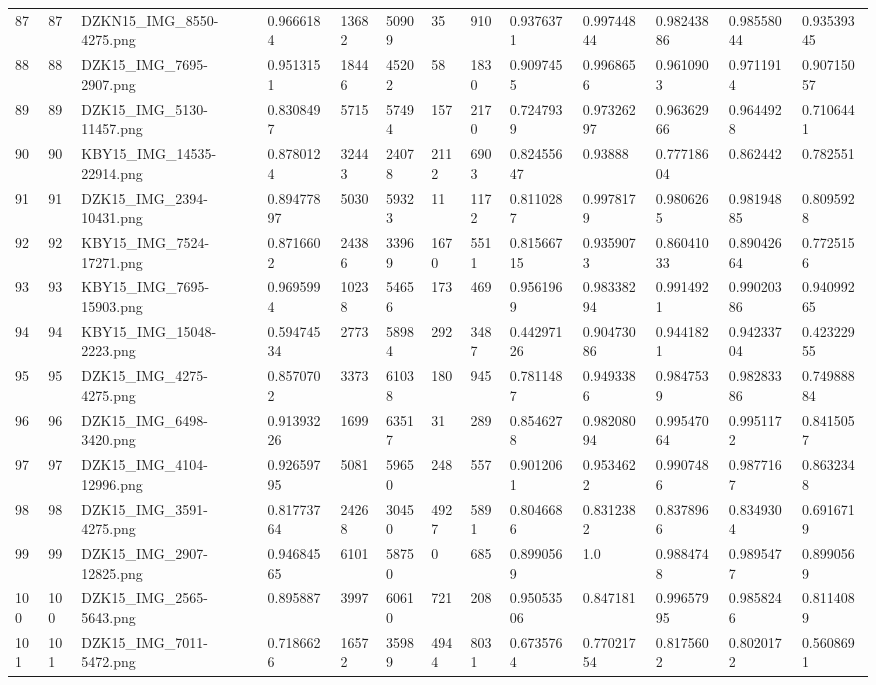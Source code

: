 \documentclass[11pt, a4paper, twoside]{report}
\begin{document}
\begin{longtable}[c]{@{}lllllllllllll@{}}
87 & 87 & DZKN15\_IMG\_8550-4275.png & 0.9666184 & 13682 & 50909 & 35 & 910 & 0.9376371 & 0.99744844 & 0.98243886 & 0.98558044 & 0.93539345 \\
88 & 88 & DZK15\_IMG\_7695-2907.png & 0.9513151 & 18446 & 45202 & 58 & 1830 & 0.9097455 & 0.9968656 & 0.9610903 & 0.9711914 & 0.90715057 \\
89 & 89 & DZK15\_IMG\_5130-11457.png & 0.8308497 & 5715 & 57494 & 157 & 2170 & 0.7247939 & 0.97326297 & 0.96362966 & 0.9644928 & 0.7106441 \\
90 & 90 & KBY15\_IMG\_14535-22914.png & 0.8780124 & 32443 & 24078 & 2112 & 6903 & 0.82455647 & 0.93888 & 0.77718604 & 0.862442 & 0.782551 \\
91 & 91 & DZK15\_IMG\_2394-10431.png & 0.89477897 & 5030 & 59323 & 11 & 1172 & 0.8110287 & 0.9978179 & 0.9806265 & 0.98194885 & 0.8095928 \\
92 & 92 & KBY15\_IMG\_7524-17271.png & 0.8716602 & 24386 & 33969 & 1670 & 5511 & 0.81566715 & 0.9359073 & 0.86041033 & 0.89042664 & 0.7725156 \\
93 & 93 & KBY15\_IMG\_7695-15903.png & 0.9695994 & 10238 & 54656 & 173 & 469 & 0.9561969 & 0.98338294 & 0.9914921 & 0.99020386 & 0.94099265 \\
94 & 94 & KBY15\_IMG\_15048-2223.png & 0.59474534 & 2773 & 58984 & 292 & 3487 & 0.44297126 & 0.90473086 & 0.9441821 & 0.94233704 & 0.42322955 \\
95 & 95 & DZK15\_IMG\_4275-4275.png & 0.8570702 & 3373 & 61038 & 180 & 945 & 0.7811487 & 0.9493386 & 0.9847539 & 0.98283386 & 0.74988884 \\
96 & 96 & DZK15\_IMG\_6498-3420.png & 0.91393226 & 1699 & 63517 & 31 & 289 & 0.8546278 & 0.98208094 & 0.99547064 & 0.9951172 & 0.8415057 \\
97 & 97 & DZK15\_IMG\_4104-12996.png & 0.92659795 & 5081 & 59650 & 248 & 557 & 0.9012061 & 0.9534622 & 0.9907486 & 0.9877167 & 0.8632348 \\
98 & 98 & DZK15\_IMG\_3591-4275.png & 0.81773764 & 24268 & 30450 & 4927 & 5891 & 0.8046686 & 0.8312382 & 0.8378966 & 0.8349304 & 0.6916719 \\
99 & 99 & DZK15\_IMG\_2907-12825.png & 0.94684565 & 6101 & 58750 & 0 & 685 & 0.8990569 & 1.0 & 0.9884748 & 0.9895477 & 0.8990569 \\
100 & 100 & DZK15\_IMG\_2565-5643.png & 0.895887 & 3997 & 60610 & 721 & 208 & 0.95053506 & 0.847181 & 0.99657995 & 0.9858246 & 0.8114089 \\
101 & 101 & DZK15\_IMG\_7011-5472.png & 0.7186626 & 16572 & 35989 & 4944 & 8031 & 0.6735764 & 0.77021754 & 0.8175602 & 0.8020172 & 0.5608691 \\

\end{longtable}
\end{document}
